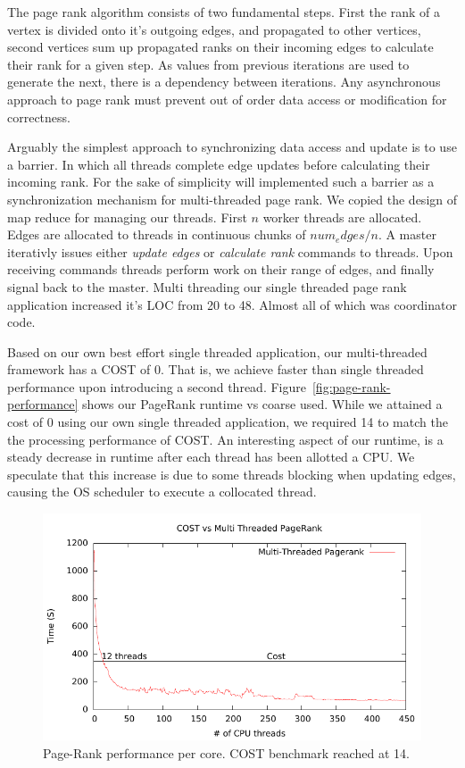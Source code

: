 The page rank algorithm consists of two fundamental steps. First the
rank of a vertex is divided onto it's outgoing edges, and propagated to
other vertices, second vertices sum up propagated ranks on their
incoming edges to calculate their rank for a given step. As values
from previous iterations are used to generate the next, there is a
dependency between iterations. Any asynchronous approach to page rank
must prevent out of order data access or modification for correctness.

Arguably the simplest approach to synchronizing data access and update
is to use a barrier. In which all threads complete edge updates before
calculating their incoming rank. For the sake of simplicity will
implemented such a barrier as a synchronization mechanism for
multi-threaded page rank. We copied the design of map reduce for
managing our threads. First $n$ worker threads are allocated. Edges
are allocated to threads in continuous chunks of $num_edges / n$. A
master iterativly issues either \emph{update edges} or
\emph{calculate rank} commands to threads. Upon receiving commands
threads perform work on their range of edges, and finally signal back
to the master. Multi threading our single threaded page rank
application increased it's LOC from 20 to 48. Almost all of which was
coordinator code.

Based on our own best effort single threaded application, our
multi-threaded framework has a COST of 0. That is, we achieve faster
than single threaded performance upon introducing a second thread.
Figure~\ref{fig:page-rank-performance} shows our PageRank runtime vs
coarse used. While we attained a cost of 0 using our own single
threaded application, we required 14 to match the the processing
performance of COST. An interesting aspect of our runtime, is a steady
decrease in runtime after each thread has been allotted a CPU. We
speculate that this increase is due to some threads blocking when
updating edges, causing the OS scheduler to execute a collocated thread.

\begin{figure}[h]
\includegraphics[width=\linewidth]{"fig/page_rank_performance"}
\caption{Page-Rank performance per core. COST benchmark reached at 14.}
\label{fig:page-rank-perfomance}
\end{figure}

